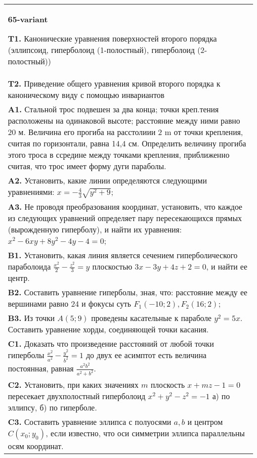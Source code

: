 \documentclass{article}
\begin{document}
\begin{tabular}{m{17cm}}
\textbf{65-variant}
\newline

\textbf{T1.} Канонические уравнения поверхностей второго порядка (эллипсоид, гиперболоид (1-полостный), гиперболоид (2-полостный)) \\
\textbf{T2.} Приведение общего уравнения кривой второго порядка к каноническому виду с помощью инвариантов \\
\textbf{A1.} Стальной трос подвешен за два конца; точки креп.тения расположены на одинаковой высоте; расстояние между ними равно 20 м. Величина его прогиба на расстолиии 2 m от точки крепления, считая по горизонтали, равна 14,4 см. Определить величину прогиба этого троса в ссредине между точками крепления, приближенно считая, что трос имеет форму дуги параболы. \\
\textbf{A2.} Установить, какие линии определяются следующими уравнениями: $x=-\frac{4}{3} \sqrt{y^2+9} ;$ \\
\textbf{A3.} Не проводя преобразования координат, установить, что каждое из следующих уравнений определяет пару пересекающихся прямых (вырожденную гиперболу), и найти их уравнения: $x^2-6 x y+8 y^2-4 y-4=0$; \\
\textbf{B1.} Установить, какая линия является сечением гиперболического параболоида $\frac{x^2}{2}-\frac{z^2}{3}=y$ плоскостью $3 x-3 y+4 z+2=0$, и найти ее центр. \\
\textbf{B2.} Составить уравнение гиперболы, зная, что: расстояние между ее вершинами равно 24 и фокусы суть $F_1(-10 ; 2), F_2(16 ; 2)$; \\
\textbf{B3.} Из точки $A(5 ; 9)$ проведены касательные к параболе $y^2=5 x$. Составить уравнение хорды, соединяющей точки касания. \\
\textbf{C1.} Доказать что произведение расстояний от любой точки гиперболы $\frac{x^2}{a^2}-\frac{y^2}{b^2}=1$ до двух ее асимптот есть величина постоянная, равная $\frac{a^2 b^2}{a^2+b^2}$. \\
\textbf{C2.} Установить, при каких значениях $m$ плоскость $x+m z-1=0$ пересекает двухполостный гиперболоид $x^2+y^2-z^2=-1$ а) по эллипсу, б) по гиперболе. \\
\textbf{C3.} Составить уравнение эллипса с полуосями $a, b$ и центром $C\left(x_0 ; y_0\right)$, если известно, что оси симметрии эллипса параллельны осям координат. \\

\end{tabular}
\vspace{1cm}
\end{document}
